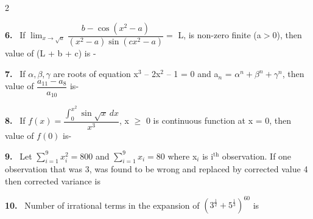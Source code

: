 \documentclass[10pt]{extarticle}
\newcommand{\qn}[1]{\par\smallskip\noindent\textbf{#1.}~}
\begin{document}
\begin{multicols}{2}
\qn{6} If $\displaystyle\lim_{x\to\sqrt{a}}\dfrac{b-\cos(x^2-a)}{(x^2-a)\sin(cx^2-a)} = $ L, is non-zero finite (a$>$0), then value of (L + b + c) is -
\qn{7} If $\alpha,\beta,\gamma$ are roots of equation x$^3$ -- 2x$^2$ -- 1 = 0 and a$_n$ = $\alpha^n+\beta^n+\gamma^n$, then value of $\dfrac{a_{11}-a_8}{a_{10}}$ is-
\qn{8} If $f(x) = \dfrac{\displaystyle\int_0^{x^2}\sin\sqrt{x}\,dx}{x^3}$, x $\geqslant$ 0 is continuous function at x = 0, then value of $f(0)$ is-
\qn{9} Let $\displaystyle\sum_{i=1}^{9}x_i^2 = 800$ and $\displaystyle\sum_{i=1}^{9}x_i = 80$ where x$_i$ is i$^{\text{th}}$ observation. If one observation that was 3, was found to be wrong and replaced by corrected value 4 then corrected variance is
\qn{10} Number of irrational terms in the expansion of $\left(3^{\frac{1}{2}}+5^{\frac{1}{3}}\right)^{60}$ is
\end{multicols}
\end{document}
